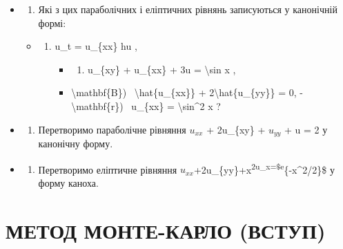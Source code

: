 \documentclass[
]{article}
\providecommand{\tightlist}{%
  \setlength{\itemsep}{0pt}\setlength{\parskip}{0pt}}
\begin{document}
\begin{itemize}
\item
  \begin{enumerate}
  \def\labelenumi{\arabic{enumi}.}
  \tightlist
  \item
    Які з цих параболічних і еліптичних рівнянь записуються у канонічній
    формі:
  \end{enumerate}

  \begin{itemize}
  \tightlist
  \item
    \begin{enumerate}
    \def\labelenumi{\alph{enumi})}
    \tightlist
    \item
      u\_t = u\_\{xx\} hu ,

      \begin{itemize}
      \tightlist
      \item
        \begin{enumerate}
        \def\labelenumii{\arabic{enumii})}
        \setcounter{enumii}{5}
        \tightlist
        \item
          u\_\{xy\} + u\_\{xx\} + 3u = \textbackslash sin x ,
        \end{enumerate}
      \item
        \textbackslash mathbf\{B\}) ~\textbackslash hat\{u\_\{xx\}\} +
        2\textbackslash hat\{u\_\{yy\}\} = 0, -
        \textbackslash mathbf\{r\}) ~u\_\{xx\} = \textbackslash sin\^{}2
        x ?
      \end{itemize}
    \end{enumerate}
  \end{itemize}
\item
  \begin{enumerate}
  \def\labelenumi{\arabic{enumi}.}
  \setcounter{enumi}{1}
  \tightlist
  \item
    Перетворимо параболічне рівняння \(u_{xx}\) + 2u\_\{xy\} +
    \(u_{yy}\) + u = 2 у канонічну форму.
  \end{enumerate}
\item
  \begin{enumerate}
  \def\labelenumi{\arabic{enumi}.}
  \setcounter{enumi}{2}
  \tightlist
  \item
    Перетворимо еліптичне рівняння
    \(u_{xx}\)+2u\_\{yy\}+x\textsuperscript{2u\_x=\$e}\{-x\^{}2/2\}\$ у
    форму каноха.
  \end{enumerate}
\end{itemize}

\section{МЕТОД МОНТЕ-КАРЛО
(ВСТУП)}\label{ux43cux435ux442ux43eux434-ux43cux43eux43dux442ux435-ux43aux430ux440ux43bux43e-ux432ux441ux442ux443ux43f}
\end{document}
